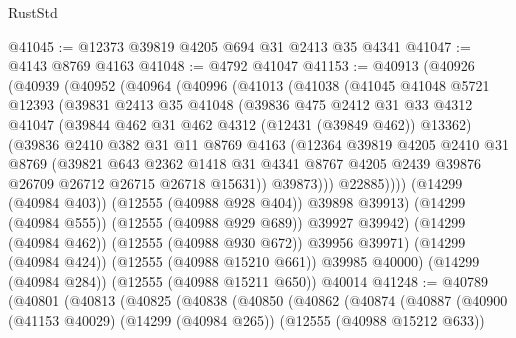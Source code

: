 \begin{lexlean}{RustStd}
\begin{coremodule}
@41045 := @12373 @39819 @4205 @694 @31 @2413 @35 @4341
@41047 := @4143 @8769 @4163
@41048 := @4792 @41047
@41153 := @40913
    (@40926
      (@40939
        (@40952
          (@40964
            (@40996
              (@41013
                (@41038
                  (@41045
                    @41048
                    @5721
                    @12393
                    (@39831
                      @2413
                      @35
                      @41048
                      (@39836
                        @475
                        @2412
                        @31
                        @33
                        @4312
                        @41047
                        (@39844 @462 @31 @462 @4312 (@12431 (@39849 @462)) @13362)
                        (@39836
                          @2410
                          @382
                          @31
                          @11
                          @8769
                          @4163
                          (@12364
                            @39819
                            @4205
                            @2410
                            @31
                            @8769
                            (@39821
                              @643
                              @2362
                              @1418
                              @31
                              @4341
                              @8767
                              @4205
                              @2439
                              @39876
                              @26709
                              @26712
                              @26715
                              @26718
                              @15631))
                          @39873)))
                    @22885))))
            (@14299 (@40984 @403))
            (@12555 (@40988 @928 @404))
            @39898
            @39913)
          (@14299 (@40984 @555))
          (@12555 (@40988 @929 @689))
          @39927
          @39942)
        (@14299 (@40984 @462))
        (@12555 (@40988 @930 @672))
        @39956
        @39971)
      (@14299 (@40984 @424))
      (@12555 (@40988 @15210 @661))
      @39985
      @40000)
    (@14299 (@40984 @284))
    (@12555 (@40988 @15211 @650))
    @40014
@41248 := @40789
    (@40801
      (@40813
        (@40825
          (@40838
            (@40850
              (@40862
                (@40874
                  (@40887
                    (@40900
                      (@41153 @40029)
                      (@14299 (@40984 @265))
                      (@12555 (@40988 @15212 @633))

\end{coremodule}
\end{lexlean}

